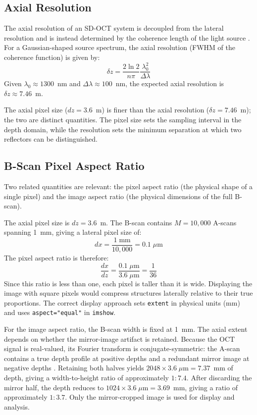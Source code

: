 \documentclass[10pt]{article}
\begin{document}
\subsection{Axial Resolution}
The axial resolution of an SD-OCT system is decoupled from the lateral resolution and is instead determined by the coherence length of the light source \cite{izattTheoryOpticalCoherence2015}. For a Gaussian-shaped source spectrum, the axial resolution (FWHM of the coherence function) is given by:
\begin{equation}
  \delta z = \frac{2 \ln 2}{n \pi}\frac{\lambda_0^2}{\Delta\lambda}
  \label{eq:axial_resolution}
\end{equation}
Given $\lambda_0 \approx 1300$~nm and $\Delta\lambda \approx 100$~nm, the expected axial resolution is $\delta z \approx 7.46$~\textmu m.

The axial pixel size ($dz = 3.6$~\textmu m) is finer than the axial resolution ($\delta z = 7.46$~\textmu m); the two are distinct quantities. The pixel size sets the sampling interval in the depth domain, while the resolution sets the minimum separation at which two reflectors can be distinguished.

\subsection{B-Scan Pixel Aspect Ratio}
Two related quantities are relevant: the pixel aspect ratio (the physical shape of a single pixel) and the image aspect ratio (the physical dimensions of the full B-scan).

The axial pixel size is $dz = 3.6$~\textmu m. The B-scan contains $M = 10{,}000$ A-scans spanning 1~mm, giving a lateral pixel size of:
\begin{equation*}
  dx = \frac{1\;\text{mm}}{10{,}000} = 0.1\;\mu\text{m}
\end{equation*}
The pixel aspect ratio is therefore:
\begin{equation*}
  \frac{dx}{dz} = \frac{0.1\;\mu\text{m}}{3.6\;\mu\text{m}} = \frac{1}{36}
\end{equation*}
Since this ratio is less than one, each pixel is taller than it is wide. Displaying the image with square pixels would compress structures laterally relative to their true proportions. The correct display approach sets \texttt{extent} in physical units (mm) and uses \texttt{aspect="equal"} in \texttt{imshow}.

For the image aspect ratio, the B-scan width is fixed at 1~mm. The axial extent depends on whether the mirror-image artifact is retained. Because the OCT signal is real-valued, its Fourier transform is conjugate-symmetric: the A-scan contains a true depth profile at positive depths and a redundant mirror image at negative depths \cite{izattTheoryOpticalCoherence2015}. Retaining both halves yields $2048 \times 3.6\;\mu\text{m} = 7.37$~mm of depth, giving a width-to-height ratio of approximately $1{:}7.4$. After discarding the mirror half, the depth reduces to $1024 \times 3.6\;\mu\text{m} = 3.69$~mm, giving a ratio of approximately $1{:}3.7$. Only the mirror-cropped image is used for display and analysis.
\end{document}
